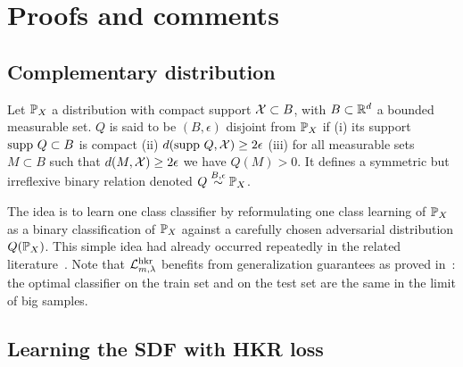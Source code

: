 \tableofcontents

\section{Proofs and comments}\label{app:pandc}

\subsection{Complementary distribution}

\begin{definition}\label{def:bedd}
Let $\mathbb{P}_X$ a distribution with compact support $\mathcal{X} \subset B$, with $B\subset\mathbb{R}^d$ a bounded measurable set. $Q$ is said to be $(B,\epsilon)$ disjoint from $\mathbb{P}_X$ if (i) its support $\text{supp }Q\subset B$ is compact (ii) $d(\text{supp }Q, \mathcal{X})\geq 2\epsilon$ (iii) for all measurable sets $M\subset B$ such that $d(M,\mathcal{X})\geq 2\epsilon$ we have $Q(M)>0$.  
It defines a symmetric but irreflexive binary relation denoted $Q\stackrel{B,\epsilon}{\sim}\mathbb{P}_X$.  
\end{definition}

The idea is to learn one class classifier by reformulating one class learning of $\mathbb{P}_X$ as a binary classification of $\mathbb{P}_X$ against a carefully chosen adversarial distribution $Q(\mathbb{P}_X)$. This simple idea had already occurred repeatedly in the related literature~\cite{sabokrou2018adversarially}. Note that $\mathcal{L}^{\text{hkr}}_{m,\lambda}$ benefits from generalization guarantees as proved in~\cite{bethune2022pay}: the optimal classifier on the train set and on the test set are the same in the limit of big samples.  
 
\subsection{Learning the SDF with HKR loss}


